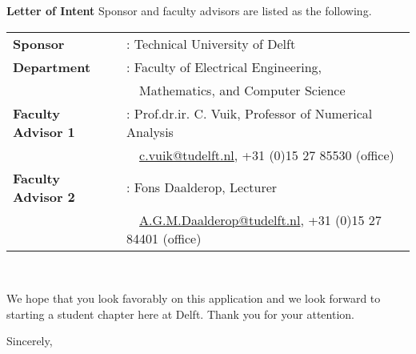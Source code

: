 \documentclass[letterpaper,12pt]{letter}
\begin{document}
\begin{letter}{\textbf{Letter of Intent}}
Sponsor and faculty advisors are listed as the following.

\begin{tabular}{ll}
\textbf{Sponsor} &: Technical University of Delft \\
\textbf{Department} &: Faculty of Electrical Engineering, \\
&\ \ Mathematics, and Computer Science \\
\textbf{Faculty Advisor 1} &: Prof.dr.ir. C. Vuik, Professor of Numerical Analysis \\
&\ \ \href{c.vuik@tudelft.nl}{c.vuik@tudelft.nl}, +31 (0)15 27 85530 (office) \\
\textbf{Faculty Advisor 2} &: Fons Daalderop, Lecturer \\
&\ \ \href{A.G.M.Daalderop@tudelft.nl}{A.G.M.Daalderop@tudelft.nl}, +31 (0)15 27 84401 (office) \\
\end{tabular}

\\ \vspace{0.5cm}

We hope that you look favorably on this application and we look forward to starting a student chapter here at Delft. Thank you for your attention.

\closing{Sincerely,}


\end{letter}
\end{document}
